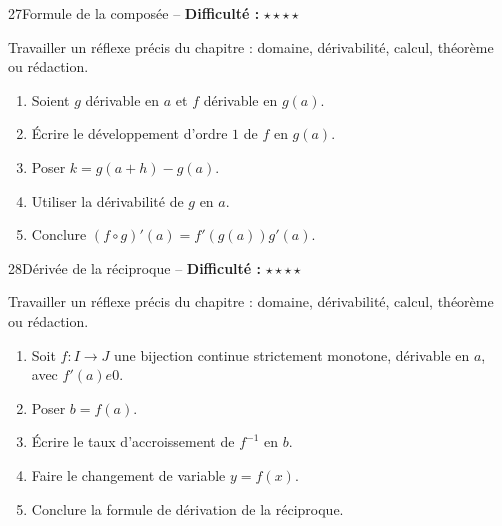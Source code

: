 \documentclass[11pt,a4paper]{article}
\newcommand{\etoiles}[1]{\textbf{Difficulté :} #1}
\begin{document}
\begin{exobox}{27}{Formule de la composée -- \etoiles{$\star\star\star\star$}}

\begin{objectifbox}
Travailler un réflexe précis du chapitre : domaine, dérivabilité, calcul, théorème ou rédaction.
\end{objectifbox}

\begin{enumerate}

\item Soient $g$ dérivable en $a$ et $f$ dérivable en $g(a)$.

\item Écrire le développement d'ordre $1$ de $f$ en $g(a)$.

\item Poser $k=g(a+h)-g(a)$.

\item Utiliser la dérivabilité de $g$ en $a$.

\item Conclure $(f\circ g)'(a)=f'(g(a))g'(a)$.

\end{enumerate}

\end{exobox}


\begin{exobox}{28}{Dérivée de la réciproque -- \etoiles{$\star\star\star\star$}}

\begin{objectifbox}
Travailler un réflexe précis du chapitre : domaine, dérivabilité, calcul, théorème ou rédaction.
\end{objectifbox}

\begin{enumerate}

\item Soit $f:I\to J$ une bijection continue strictement monotone, dérivable en $a$, avec $f'(a)
e0$.

\item Poser $b=f(a)$.

\item Écrire le taux d'accroissement de $f^{-1}$ en $b$.

\item Faire le changement de variable $y=f(x)$.

\item Conclure la formule de dérivation de la réciproque.

\end{enumerate}

\end{exobox}
\end{document}
